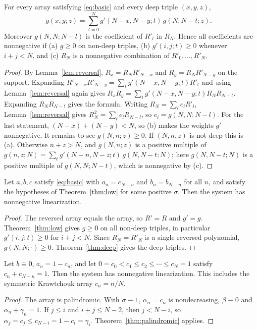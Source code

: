 \begin{theorem}\label{thm:deep}
For every array satisfying \eqref{eq:basic} and every deep triple $(x,y,z)$,
\[
g(x,y;z)=\sum_{t=0}^Ng'(N-x,N-y;t)\,g(N,N-t;z).
\]
Moreover $g(N,N;N-l)$ is the coefficient of $R'_l$ in $R_N$. Hence all coefficients are nonnegative if (a) $g\geq0$ on non-deep triples, (b) $g'(i,j;t)\geq0$ whenever $i+j<N$, and (c) $R_N$ is a nonnegative combination of $R'_0,\ldots,R'_N$.
\end{theorem}
\begin{proof}
By Lemma~\ref{lem:reversal}, $R_x=R_NR'_{N-x}$ and $R_y=R_NR'_{N-y}$ on the support. Expanding $R'_{N-x}R'_{N-y}=\sum_tg'(N-x,N-y;t)R'_t$ and using Lemma~\ref{lem:reversal} again gives $R_xR_y=\sum_tg'(N-x,N-y;t)R_NR_{N-t}$. Expanding $R_NR_{N-t}$ gives the formula. Writing $R_N=\sum_le_lR'_l$, Lemma~\ref{lem:reversal} gives $R_N^2=\sum_le_lR_{N-l}$, so $e_l=g(N,N;N-l)$. For the last statement, $(N-x)+(N-y)<N$, so (b) makes the weights $g'$ nonnegative. It remains to see $g(N,n;z)\geq0$. If $(N,n,z)$ is not deep this is (a). Otherwise $n+z>N$, and $g(N,n;z)$ is a positive multiple of $g(n,z;N)=\sum_tg'(N-n,N-z;t)\,g(N,N-t;N)$; here $g(N,N-t;N)$ is a positive multiple of $g(N,N;N-t)$, which is nonnegative by (c).
\end{proof}

\begin{theorem}\label{thm:palindromic}
Let $a,b,c$ satisfy \eqref{eq:basic} with $a_n=c_{N-n}$ and $b_n=b_{N-n}$ for all $n$, and satisfy the hypotheses of Theorem~\ref{thm:low} for some positive $\sigma$. Then the system has nonnegative linearization.
\end{theorem}
\begin{proof}
The reversed array equals the array, so $R'=R$ and $g'=g$. Theorem~\ref{thm:low} gives $g\geq0$ on all non-deep triples, in particular $g'(i,j;t)\geq0$ for $i+j<N$. Since $R_N=R'_N$ is a single reversed polynomial, $g(N,N;\cdot)\geq0$. Theorem~\ref{thm:deep} gives the deep triples.
\end{proof}

\begin{corollary}\label{cor:palin}
Let $b\equiv0$, $a_n=1-c_n$, and let $0=c_0<c_1\leq c_2\leq\cdots\leq c_N=1$ satisfy $c_n+c_{N-n}=1$. Then the system has nonnegative linearization. This includes the symmetric Krawtchouk array $c_n=n/N$.
\end{corollary}
\begin{proof}
The array is palindromic. With $\sigma\equiv1$, $\alpha_n=c_n$ is nondecreasing, $\beta\equiv0$ and $\alpha_n+\gamma_n=1$. If $j\leq i$ and $i+j\leq N-2$, then $j<N-i$, so $\alpha_j=c_j\leq c_{N-i}=1-c_i=\gamma_i$. Theorem~\ref{thm:palindromic} applies.
\end{proof}

